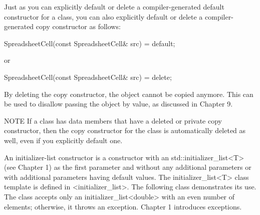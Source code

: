 
Just as you can explicitly default or delete a compiler-generated default constructor for a class, you can also explicitly default or delete a compiler-generated copy constructor as follows:

\begin{cpp}
SpreadsheetCell(const SpreadsheetCell& src) = default;
\end{cpp}

or

\begin{cpp}
SpreadsheetCell(const SpreadsheetCell& src) = delete;
\end{cpp}

By deleting the copy constructor, the object cannot be copied anymore. This can be used to disallow passing the object by value, as discussed in Chapter 9.

\begin{myNotic}{NOTE}
If a class has data members that have a deleted or private copy constructor, then the copy constructor for the class is automatically deleted as well, even if you explicitly default one.
\end{myNotic}


An initializer-list constructor is a constructor with an std::initializer\_list<T> (see Chapter 1) as the first parameter and without any additional parameters or with additional parameters having default values. The initializer\_list<T> class template is defined in <initializer\_list>. The following class demonstrates its use. The class accepts only an initializer\_list<double> with an even number of elements; otherwise, it throws an exception. Chapter 1 introduces exceptions.


